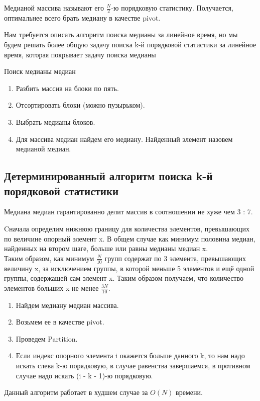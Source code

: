 \Def Медианой массива называют его $\frac{N}{2}$-ю порядковую статистику. Получается, оптимальнее всего брать медиану в качестве pivot.

Нам требуется описать алгоритм поиска медианы за линейное время, но мы будем решать более общую задачу поиска k-й порядковой статистики за линейное время, которая покрывает задачу поиска медианы

\Alg Поиск медианы медиан
\begin{enumerate}
\item Разбить массив на блоки по пять.
\item Отсортировать блоки (можно пузырьком).
\item Выбрать медианы блоков.
\item Для массива медиан найдем его медиану. Найденный элемент назовем медианой медиан.
\end{enumerate}

\subsection*{Детерминированный алгоритм поиска k-й порядковой статистики}

\Statement Медиана медиан гарантированно делит массив в соотношении не хуже чем 3 : 7.

\Proof Cначала определим нижнюю границу для количества элементов, превышающих по величине опорный элемент x. В общем случае как минимум половина медиан, найденных на втором шаге, больше или равны медианы медиан x.
\\Таким образом, как минимум $\frac{N}{10}$ групп содержат по 3 элемента, превышающих величину x, за исключением группы, в которой меньше 5 элементов и ещё одной группы, содержащей сам элемент x. Таким образом получаем, что количество элементов больших x не менее $\frac{3N}{10}$. \Endproof

\Alg
\begin{enumerate}
    \item Найдем медиану медиан массива.
    \item Возьмем ее в качестве pivot.
    \item Проведем Partition.
    \item Если индекс опорного элемента i окажется больше данного k, то нам надо искать слева k-ю порядковую, в случае равенства завершаемся, в противном случае надо искать (i - k - 1)-ю порядковую.
\end{enumerate}

\Statement Данный алгоритм работает в худшем случае за $O(N)$ времени.

